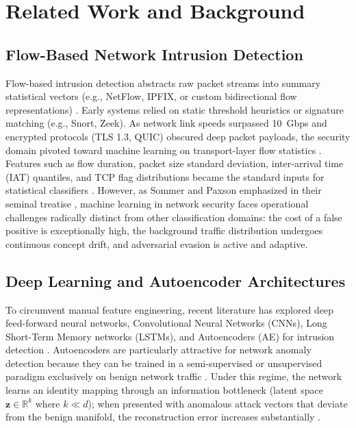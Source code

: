 \documentclass[conference]{IEEEtran}
\begin{document}
\section{Related Work and Background}

\subsection{Flow-Based Network Intrusion Detection}
Flow-based intrusion detection abstracts raw packet streams into summary statistical vectors (e.g., NetFlow, IPFIX, or custom bidirectional flow representations) \cite{claise2004cisco, trammell2011introduction}. Early systems relied on static threshold heuristics or signature matching (e.g., Snort, Zeek). As network link speeds surpassed 10~Gbps and encrypted protocols (TLS 1.3, QUIC) obscured deep packet payloads, the security domain pivoted toward machine learning on transport-layer flow statistics \cite{velan2015survey}. Features such as flow duration, packet size standard deviation, inter-arrival time (IAT) quantiles, and TCP flag distributions became the standard inputs for statistical classifiers \cite{sperotto2010overview}. However, as Sommer and Paxson emphasized in their seminal treatise \cite{sommer2010outside}, machine learning in network security faces operational challenges radically distinct from other classification domains: the cost of a false positive is exceptionally high, the background traffic distribution undergoes continuous concept drift, and adversarial evasion is active and adaptive.

\subsection{Deep Learning and Autoencoder Architectures}
To circumvent manual feature engineering, recent literature has explored deep feed-forward neural networks, Convolutional Neural Networks (CNNs), Long Short-Term Memory networks (LSTMs), and Autoencoders (AE) for intrusion detection \cite{sultana2019survey, ferrag2020deep, wang2017malware}. Autoencoders are particularly attractive for network anomaly detection because they can be trained in a semi-supervised or unsupervised paradigm exclusively on benign network traffic \cite{mirsky2018kitsune}. Under this regime, the network learns an identity mapping through an information bottleneck (latent space $\mathbf{z} \in \mathbb{R}^k$ where $k \ll d$); when presented with anomalous attack vectors that deviate from the benign manifold, the reconstruction error increases substantially \cite{zhou2017anomaly}.
\end{document}

